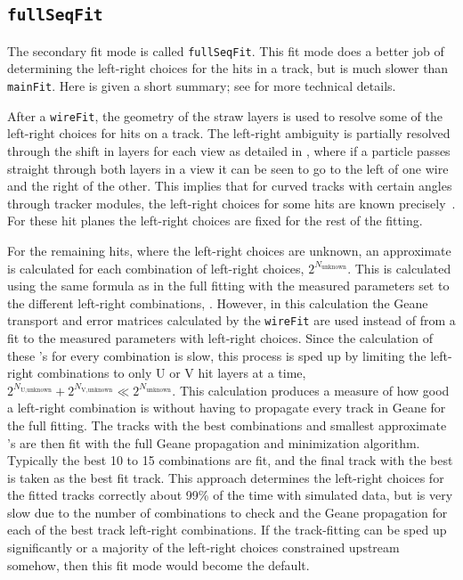 \subsection*{\texttt{fullSeqFit}}

The secondary fit mode is called \texttt{fullSeqFit}. This fit mode does a better job of determining the left-right choices for the hits in a track, but is much slower than \texttt{mainFit}. Here is given a short summary; see  for more technical details.

After a \texttt{wireFit}, the geometry of the straw layers is used to resolve some of the left-right choices for hits on a track. The left-right ambiguity is partially resolved through the shift in layers for each view as detailed in , where if a particle passes straight through both layers in a view it can be seen to go to the left of one wire and the right of the other. This implies that for curved tracks with certain angles through tracker modules, the left-right choices for some hits are known precisely~\cite{JoeLR}. For these hit planes the left-right choices are fixed for the rest of the fitting.

For the remaining hits, where the left-right choices are unknown, an approximate \chisq is calculated for each combination of left-right choices, $2^{N_{\text{unknown}}}$. This \chisq is calculated using the same formula as in the full fitting with the measured parameters set to the different left-right combinations, . However, in this calculation the Geane transport and error matrices calculated by the \texttt{wireFit} are used instead of from a fit to the measured parameters with left-right choices. Since the calculation of these \chisq's for every combination is slow, this process is sped up by limiting the left-right combinations to only U or V hit layers at a time, $2^{N_{\text{U,unknown}}} + 2^{N_{\text{V,unknown}}} \ll 2^{N_{\text{unknown}}}$. This \chisq calculation produces a measure of how good a left-right combination is without having to propagate every track in Geane for the full fitting. The tracks with the best combinations and smallest approximate \chisq's are then fit with the full Geane propagation and \chisq minimization algorithm. Typically the best 10 to 15 combinations are fit, and the final track with the best \chisq is taken as the best fit track. This approach determines the left-right choices for the fitted tracks correctly about 99\% of the time with simulated data, but is very slow due to the number of combinations to check and the Geane propagation for each of the best track left-right combinations. If the track-fitting can be sped up significantly or a majority of the left-right choices constrained upstream somehow, then this fit mode would become the default. 





